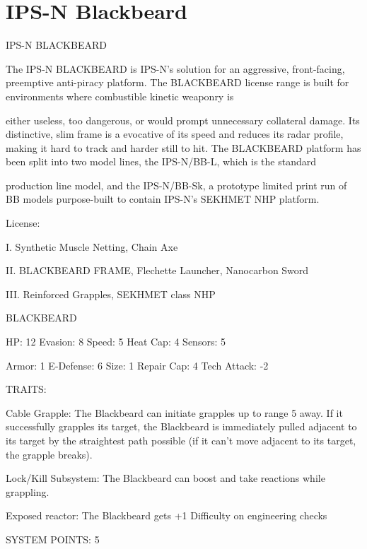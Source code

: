 \section{IPS-N Blackbeard}

                                         IPS-N BLACKBEARD


The IPS-N BLACKBEARD is IPS-N’s solution for an aggressive, front-facing, preemptive anti-piracy
platform. The BLACKBEARD license range is built for environments where combustible kinetic weaponry is

either useless, too dangerous, or would prompt unnecessary collateral damage. Its distinctive, slim frame is
a evocative of its speed and reduces its radar profile, making it hard to track and harder still to hit. The
BLACKBEARD platform has been split into two model lines, the IPS-N/BB-L, which is the standard

production line model, and the IPS-N/BB-Sk, a prototype limited print run of BB models purpose-built to
contain IPS-N’s SEKHMET NHP platform.

                                                     License:

I. Synthetic Muscle Netting, Chain Axe

II. BLACKBEARD FRAME, Flechette Launcher, Nanocarbon Sword

III. Reinforced Grapples, SEKHMET class NHP


                                                BLACKBEARD

  HP: 12          Evasion: 8                             Speed: 5            Heat Cap: 4        Sensors: 5

  Armor: 1        E-Defense: 6                           Size: 1             Repair Cap: 4      Tech Attack: -2

                                                     TRAITS:

  Cable Grapple: The Blackbeard can initiate grapples up to range 5 away. If it successfully grapples its
  target, the Blackbeard is immediately pulled adjacent to its target by the straightest path possible (if it
  can’t move adjacent to its target, the grapple breaks).

  Lock/Kill Subsystem: The Blackbeard can boost and take reactions while grappling.

  Exposed reactor: The Blackbeard gets +1 Difficulty on engineering checks

                                               SYSTEM POINTS: 5

